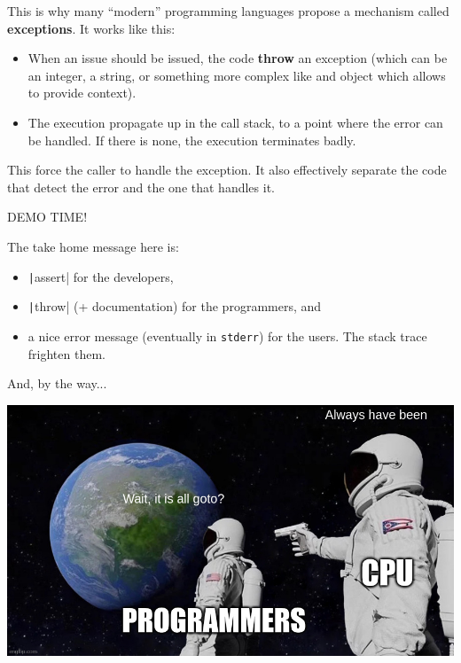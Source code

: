 \documentclass[10pt,
aspectratio=169
]{beamer}
\begin{document}
\begin{frame}
This is why many ``modern'' programming languages propose a mechanism called \textbf{exceptions}.  It works like this:\begin{itemize}
	\item When an issue should be issued, the code \textbf{throw} an exception (which can be an integer, a string, or something more complex like and object which allows to provide context).
	\item The execution propagate up in the call stack, to a point where the error can be handled. If there is none, the execution terminates badly.
\end{itemize}
This force the caller to handle the exception. It also effectively separate the code that detect the error and the one that handles it.
\end{frame}

\begin{frame}
\begin{center}
	{\LARGE DEMO TIME!}
\end{center}
\end{frame}

\begin{frame}
The take home message here is:\begin{itemize}
	\item \texttt|assert| for the developers,
	\item \texttt|throw| (+ documentation) for the programmers, and
	\item a nice error message (eventually in \texttt{stderr}) for the users. The stack trace frighten them.
\end{itemize}


And, by the way...
\pause

\begin{center}
	\includegraphics[width=.5\linewidth]{im/meme-goto}
\end{center}
\end{frame}
\end{document}
